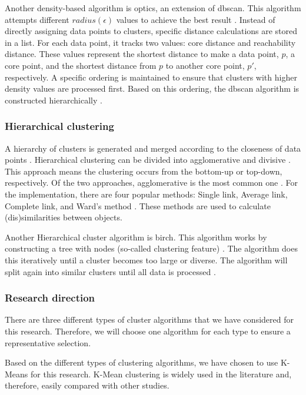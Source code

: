 Another density-based algorithm is \gls{optics}, an extension of \gls{dbscan}.
This algorithm attempts different $radius(\epsilon)$ values to achieve the best result \citep{ankerst_optics_nodate}.
Instead of directly assigning data points to clusters, specific distance calculations are stored in a list.
For each data point, it tracks two values: core distance and reachability distance.
These values represent the shortest distance to make a data point, $p$, a core point, and the shortest distance from $p$ to another core point, $p'$, respectively.
A specific ordering is maintained to ensure that clusters with higher density values are processed first.
Based on this ordering, the \gls{dbscan} algorithm is constructed hierarchically \citep{schubert_dbscan_2017}.


\subsubsection{Hierarchical clustering}
A hierarchy of clusters is generated and merged according to the closeness of data points \citep{meng_private_2021}.
Hierarchical clustering can be divided into agglomerative and divisive \citep{meng_private_2021}.
This approach means the clustering occurs from the bottom-up or top-down, respectively.
Of the two approaches, agglomerative is the most common one \citep{meng_private_2021}.
For the implementation, there are four popular methods: Single link, Average link, Complete link, and Ward's method \citep{roux_comparative_2015}.
These methods are used to calculate (dis)similarities between objects.

Another Hierarchical cluster algorithm is \gls{birch}.
This algorithm works by constructing a tree with nodes (so-called clustering feature) \citep{zhang_birch_1996}.
The algorithm does this iteratively until a cluster becomes too large or diverse.
The algorithm will split again into similar clusters until all data is processed \citep{zhang_birch_1996}.
\subsubsection{Research direction}
There are three different types of cluster algorithms that we have considered for this research.
Therefore, we will choose one algorithm for each type to ensure a representative selection.

Based on the different types of clustering algorithms, we have chosen to use K-Means for this research.
K-Mean clustering is widely used in the literature and, therefore, easily compared with other studies.

